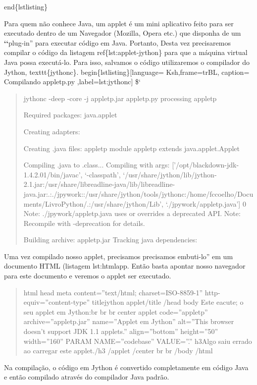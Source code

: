 \documentclass[a4paper,10pt,brazil]{sphinxmanual}
\begin{document}
end\{lstlisting\}

Para quem não conhece Java, um applet é um mini aplicativo feito para ser executado dentro de um Navegador (Mozilla, Opera etc.) que disponha de um {\color{red}\bfseries{}{}`{}`}plug-in'' para executar código em Java. Portanto, Desta vez precisaremos compilar o código da listagem ref\{lst:applet-jython\} para que a máquina virtual Java possa executá-lo. Para isso, salvamos o código  utilizaremos o compilador do Jython, texttt\{jythonc\}.
begin\{lstlisting\}{[}language= Ksh,frame=trBL, caption= Compilando appletp.py ,label=lst:jythonc{]}
\${}`
\begin{quote}

jythonc -deep -core -j appletp.jar appletp.py processing appletp

Required packages: java.applet

Creating adapters:

Creating .java files: appletp module appletp extends
java.applet.Applet

Compiling .java to .class... Compiling with args:
{[}'/opt/blackdown-jdk-1.4.2.01/bin/javac', `-classpath',
`/usr/share/jython/lib/jython-2.1.jar:/usr/share/libreadline-java/lib/libreadline-java.jar:.:./jpywork::/usr/share/jython/tools/jythonc:/home/fccoelho/Documents/LivroPython/.:/usr/share/jython/Lib',
`./jpywork/appletp.java'{]} 0 Note: ./jpywork/appletp.java uses or
overrides a deprecated API. Note: Recompile with -deprecation for
details.

Building archive: appletp.jar Tracking java dependencies:
\end{quote}

Uma vez compilado nosso applet, precisamos precisamos embuti-lo'' em
um documento HTML (listagem lst:htmlapp. Então basta apontar nosso
navegador para este documento e veremos o applet ser executado.
\begin{quote}

html head meta content=''text/html; charset=ISO-8859-1''
http-equiv=''content-type'' titlejython applet/title /head body Este
eacute; o seu applet em Jython:br br br center applet
code=''appletp'' archive=''appletp.jar'' name=''Applet em Jython''
alt=''This browser doesn't support JDK 1.1 applets.'' align=''bottom''
height=''50'' width=''160'' PARAM NAME=''codebase'' VALUE=''.'' h3Algo saiu
errado ao carregar este applet./h3 /applet /center br br /body
/html
\end{quote}

Na compilação, o código em Jython é convertido completamente em
código Java e então compilado através do compilador Java padrão.
\end{document}
